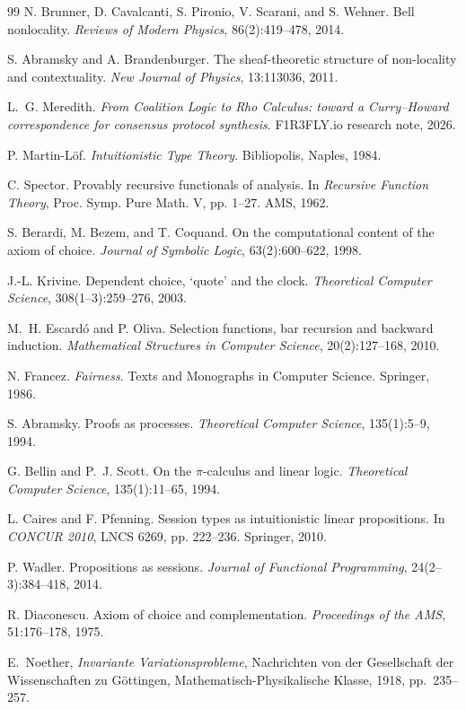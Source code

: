 \begin{thebibliography}{99}
N. Brunner, D. Cavalcanti, S. Pironio, V. Scarani, and S. Wehner. Bell nonlocality.
\emph{Reviews of Modern Physics}, 86(2):419--478, 2014.

S. Abramsky and A. Brandenburger. The sheaf-theoretic structure of non-locality and
contextuality. \emph{New Journal of Physics}, 13:113036, 2011.


L.~G. Meredith. \emph{From Coalition Logic to Rho Calculus: toward a Curry--Howard
correspondence for consensus protocol synthesis}. F1R3FLY.io research note, 2026.

P. Martin-L\"of. \emph{Intuitionistic Type Theory}. Bibliopolis, Naples, 1984.

C. Spector. Provably recursive functionals of analysis. In \emph{Recursive Function
Theory}, Proc. Symp. Pure Math. V, pp. 1--27. AMS, 1962.

S. Berardi, M. Bezem, and T. Coquand. On the computational content of the axiom of
choice. \emph{Journal of Symbolic Logic}, 63(2):600--622, 1998.

J.-L. Krivine. Dependent choice, `quote' and the clock.
\emph{Theoretical Computer Science}, 308(1--3):259--276, 2003.

M.~H. Escard\'o and P. Oliva. Selection functions, bar recursion and backward
induction. \emph{Mathematical Structures in Computer Science}, 20(2):127--168, 2010.

N. Francez. \emph{Fairness}. Texts and Monographs in Computer Science. Springer, 1986.

S. Abramsky. Proofs as processes. \emph{Theoretical Computer Science},
135(1):5--9, 1994.

G. Bellin and P.~J. Scott. On the $\pi$-calculus and linear logic.
\emph{Theoretical Computer Science}, 135(1):11--65, 1994.

L. Caires and F. Pfenning. Session types as intuitionistic linear propositions.
In \emph{CONCUR 2010}, LNCS 6269, pp. 222--236. Springer, 2010.

P. Wadler. Propositions as sessions. \emph{Journal of Functional Programming},
24(2--3):384--418, 2014.

R. Diaconescu. Axiom of choice and complementation.
\emph{Proceedings of the AMS}, 51:176--178, 1975.


E.~Noether, \emph{Invariante Variationsprobleme}, Nachrichten von der Gesellschaft der Wissenschaften zu G\"ottingen, Mathematisch-Physikalische Klasse, 1918, pp.~235--257.


\end{thebibliography}

